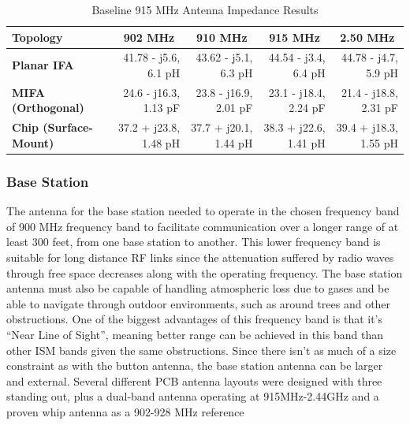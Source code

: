 \documentclass[journal,compsoc]{IEEEtran}
\begin{document}
\begin{table}[t]
  \centering
  \begin{tabular}{>{\bfseries}l|l l l l}
  \hline
    Topology & \multicolumn{1}{|c|}{902 MHz} & \multicolumn{1}{|c|}{910 MHz} & \multicolumn{1}{|c|}{915 MHz} & \multicolumn{1}{|c|}{2.50 MHz} \\
    \hline
    Planar IFA & \multicolumn{1}{|r|}{41.78 - j5.6, 6.1 pH} & \multicolumn{1}{|r|}{43.62 - j5.1, 6.3 pH} & \multicolumn{1}{|r|}{44.54 - j3.4, 6.4 pH} & \multicolumn{1}{|r|}{44.78 - j4.7, 5.9 pH} \\
    MIFA (Orthogonal) & \multicolumn{1}{|r|}{24.6 - j16.3, 1.13 pF} & \multicolumn{1}{|r|}{23.8 - j16.9, 2.01 pF} & \multicolumn{1}{|r|}{23.1 - j18.4, 2.24 pF} & \multicolumn{1}{|r|}{21.4 - j18.8, 2.31 pF} \\
    Chip (Surface-Mount) & \multicolumn{1}{|r|}{37.2 + j23.8, 1.48 pH} & \multicolumn{1}{|r|}{37.7 + j20.1, 1.44 pH} & \multicolumn{1}{|r|}{38.3 + j22.6, 1.41 pH} & \multicolumn{1}{|r|}{39.4 + j18.3, 1.55 pH} \\ \hline
  \end{tabular} \newline
  \caption{Baseline 915 MHz Antenna Impedance Results}
\end{table}

\subsubsection{Base Station}

The antenna for the base station needed to operate in the chosen frequency band of 900 MHz frequency band to facilitate communication over a longer range of at least 300 feet, from one base station to another.  This lower frequency band is suitable for long distance RF links since the attenuation suffered by radio waves through free space decreases along with the operating frequency.  The base station antenna must also be capable of handling atmospheric loss due to gases and be able to navigate through outdoor environments, such as around trees and other obstructions.  One of the biggest advantages of this frequency band is that it’s “Near Line of Sight”, meaning better range can be achieved in this band than other ISM bands given the same obstructions.  Since there isn’t as much of a size constraint as with the button antenna, the base station antenna can be larger and external.  Several different PCB antenna layouts were designed with three standing out, plus a dual-band antenna operating at 915MHz-2.44GHz and a proven whip antenna as a 902-928 MHz reference
\end{document}
